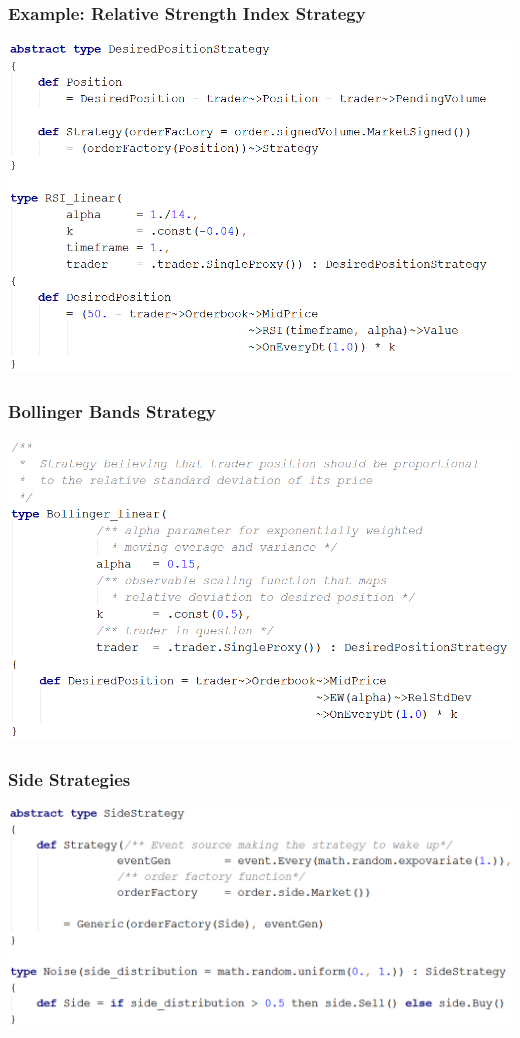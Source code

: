 \documentclass{beamer}
\begin{document}
\begin{frame}
\frametitle{Example: Relative Strength Index Strategy}
\includegraphics[width=1\linewidth]{rsi_strategy.png}
\end{frame}
\begin{frame}
\frametitle{Bollinger Bands Strategy}
\includegraphics[width=1\linewidth]{bollinger_strategy.png}
\end{frame}
\begin{frame}
\frametitle{Side Strategies}
\includegraphics[width=1\linewidth]{side_strategy.png}
\end{frame}
\end{document}

